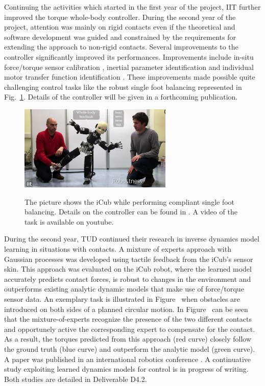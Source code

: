 Continuing the activities which started in the first year of the project, IIT further improved the torque whole-body controller. During the second year of the project, attention was mainly on rigid contacts even if the theoretical and software development was guided and constrained by the requirements for extending the approach to non-rigid contacts. Several improvements to the controller significantly improved its performances. Improvements include in-situ force/torque sensor calibration \cite{Traversaro2015b}, inertial parameter identification \cite{Traversaro2015} and individual motor transfer function identification \cite{Nori2015a}. These improvements made possible quite challenging control tasks like the robust single foot balancing represented in Fig.~\ref{fig:footBalancing}. Details of the controller will be given in a forthcoming publication.\\

\begin{figure}[h]
\vspace{0.5em}
\centering
{\includegraphics[width=0.65\textwidth]{images/single_foot_balancing.jpg}}
\caption{The picture shows the iCub while performing compliant single foot balancing. Details on the controller can be found in \cite{Nori2015a}. A video of the task is available on youtube\protect\footnotemark.}
\label{fig:footBalancing}
\end{figure}



During the second year, TUD continued their research in inverse dynamics model
learning in situations with contacts. A mixture of experts approach with
Gaussian processes was developed using tactile feedback from the iCub's sensor
skin. This approach was evaluated on the iCub robot, where the learned model
accurately predicts contact forces, is robust to changes in the environment and
outperforms existing analytic dynamic models that make use of force/torque
sensor data. 
An exemplary task is illustrated in Figure~\cite{fig:exp3:icuparis_experiment_bars} 
when obstacles are introduced on both sides of a planned circular motion.
In Figure~\cite{fig:exp3:gating} can be seen that the mixture-of-experts recognize the presence of the two different contacts and opportunely active the corresponding expert to compensate for the contact.
As a result, the torques predicted from this approach (red curve) closely follow the ground truth (blue curve) and outperform the analytic model (green curve).
A paper was published in an international robotics conference
\cite{Calandra_ICRA15}. A continuative study exploiting learned dynamics models
for control is in progress of writing. Both studies are detailed in Deliverable
D4.2.\\

